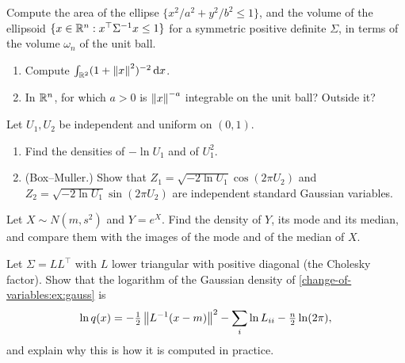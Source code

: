 \begin{notechapter}
\begin{exercise}\label{change-of-variables:exr:1}
Compute the area of the ellipse $\{x^2/a^2 + y^2/b^2\leq1\}$, and the
volume of the ellipsoid $\{x\in\mathbb{R}^n : x^\top\Sigma^{-1}x\leq1\}$ for a
symmetric positive definite $\Sigma$, in terms of the volume $\omega_n$
of the unit ball.
\end{exercise}

\begin{exercise}\label{change-of-variables:exr:2}
\begin{enumerate}[nosep]
  \item Compute $\int_{\mathbb{R}^2}(1 + \left\|x\right\|^2)^{-2}\,\mathrm{d} x$.
  \item In $\mathbb{R}^n$, for which $a > 0$ is $\left\|x\right\|^{-a}$ integrable on the
        unit ball? Outside it?
\end{enumerate}
\end{exercise}

\begin{exercise}\label{change-of-variables:exr:3}
Let $U_1, U_2$ be independent and uniform on $(0, 1)$.
\begin{enumerate}[nosep]
  \item Find the densities of $-\ln U_1$ and of $U_1^2$.
  \item (Box--Muller.) Show that
        $Z_1 = \sqrt{-2\ln U_1}\cos(2\pi U_2)$ and
        $Z_2 = \sqrt{-2\ln U_1}\sin(2\pi U_2)$ are independent standard
        Gaussian variables.
\end{enumerate}
\end{exercise}

\begin{exercise}\label{change-of-variables:exr:4}
Let $X\sim N(m, s^2)$ and $Y = e^X$. Find the density of $Y$, its mode
and its median, and compare them with the images of the mode and of the
median of $X$.
\end{exercise}

\begin{exercise}\label{change-of-variables:exr:5}
Let $\Sigma = LL^\top$ with $L$ lower triangular with positive diagonal
(the Cholesky factor). Show that the logarithm of the Gaussian density
of \cref{change-of-variables:ex:gauss} is
\[
  \ln q(x) = -\tfrac12\left\|L^{-1}(x - m)\right\|^2 - \sum_i\ln L_{ii}
  - \tfrac n2\ln(2\pi) ,
\]
and explain why this is how it is computed in practice.
\end{exercise}


\end{notechapter}
